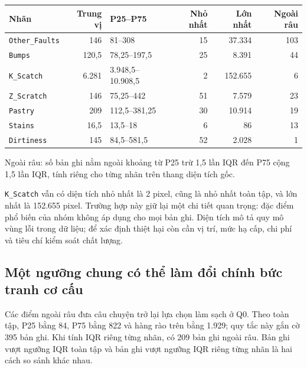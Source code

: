 \documentclass[12pt,a4paper,oneside]{report}
\newcommand{\maCot}[1]{{\urlstyle{tt}\def\UrlBreaks{\do\_\do\/\do\.}\def\UrlBigBreaks{}\nolinkurl{#1}}}
\begin{document}
\begin{center}\begin{minipage}{\linewidth}
\label{tab:ch4area}
\small{}
\begin{tabularx}{\linewidth}{@{}Y r p{3.1cm}r r r@{}}
\toprule
Nhãn & Trung vị & P25--P75 & Nhỏ nhất & Lớn nhất & Ngoài râu \\
\midrule
\maCot{Other_Faults} & 146 & 81--308 & 15 & 37.334 & 103 \\
\maCot{Bumps} & 120,5 & 78,25--197,5 & 25 & 8.391 & 44 \\
\maCot{K_Scatch} & 6.281 & 3.948,5--10.908,5 & 2 & 152.655 & 6 \\
\maCot{Z_Scratch} & 146 & 75,25--442 & 51 & 7.579 & 23 \\
\maCot{Pastry} & 209 & 112,5--381,25 & 30 & 10.914 & 19 \\
\maCot{Stains} & 16,5 & 13,5--18 & 6 & 86 & 13 \\
\maCot{Dirtiness} & 145 & 84,5--581,5 & 52 & 2.028 & 1 \\
\bottomrule
\end{tabularx}
\smallskip
\par\raggedright\footnotesize Ngoài râu: số bản ghi nằm ngoài khoảng từ P25 trừ 1,5 lần IQR đến P75 cộng 1,5 lần IQR, tính riêng cho từng nhãn trên thang diện tích gốc.
\end{minipage}\end{center}

\maCot{K_Scatch} vẫn có diện tích nhỏ nhất là 2 pixel, cũng là nhỏ nhất toàn tập, và lớn nhất là 152.655 pixel. Trường hợp này giữ lại một chi tiết quan trọng: đặc điểm phổ biến của nhóm không áp dụng cho mọi bản ghi. Diện tích mô tả quy mô vùng lỗi trong dữ liệu; để xác định thiệt hại còn cần vị trí, mức hạ cấp, chi phí và tiêu chí kiểm soát chất lượng.

\subsection{Một ngưỡng chung có thể làm đổi chính bức tranh cơ cấu}

Các điểm ngoài râu đưa câu chuyện trở lại lựa chọn làm sạch ở Q0. Theo toàn tập, P25 bằng 84, P75 bằng 822 và hàng rào trên bằng 1.929; quy tắc này gắn cờ 395 bản ghi. Khi tính IQR riêng từng nhãn, có 209 bản ghi ngoài râu. Bản ghi vượt ngưỡng IQR toàn tập và bản ghi vượt ngưỡng IQR riêng từng nhãn là hai cách so sánh khác nhau.
\end{document}
